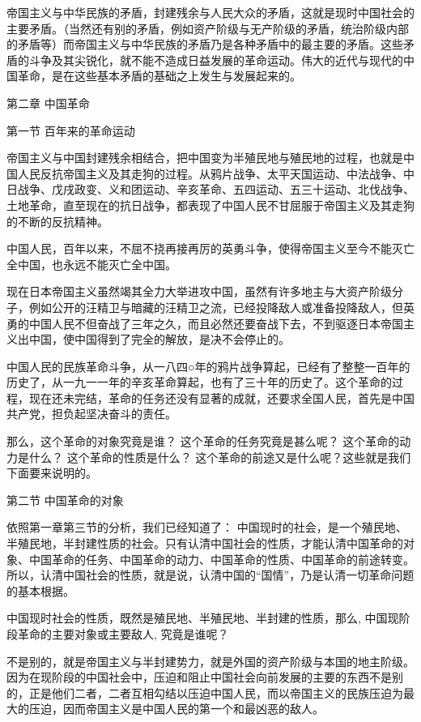 \documentclass[UTF8, 12pt, a4paper]{ctexrep}
\begin{document}
帝国主义与中华民族的矛盾，封建残余与人民大众的矛盾，这就是现时中国社会的主要矛盾。（当然还有别的矛盾，例如资产阶级与无产阶级的矛盾，统治阶级内部的矛盾等）而帝国主义与中华民族的矛盾乃是各种矛盾中的最主要的矛盾。这些矛盾的斗争及其尖锐化，就不能不造成日益发展的革命运动。伟大的近代与现代的中国革命，是在这些基本矛盾的基础之上发生与发展起来的。

第二章 中国革命

第一节 百年来的革命运动

帝国主义与中国封建残余相结合，把中国变为半殖民地与殖民地的过程，也就是中国人民反抗帝国主义及其走狗的过程。从鸦片战争、太平天国运动、中法战争、中日战争、戊戌政变、义和团运动、辛亥革命、五四运动、五三十运动、北伐战争、土地革命，直至现在的抗日战争，都表现了中国人民不甘屈服于帝国主义及其走狗的不断的反抗精神。

中国人民，百年以来，不屈不挠再接再厉的英勇斗争，使得帝国主义至今不能灭亡全中国，也永远不能灭亡全中国。

现在日本帝国主义虽然竭其全力大举进攻中国，虽然有许多地主与大资产阶级分子，例如公开的汪精卫与暗藏的汪精卫之流，已经投降敌人或准备投降敌人，但英勇的中国人民不但奋战了三年之久，而且必然还要奋战下去，不到驱逐日本帝国主义出中国，使中国得到了完全的解放，是决不会停止的。

中国人民的民族革命斗争，从一八四○年的鸦片战争算起，已经有了整整一百年的历史了，从一九一一年的辛亥革命算起，也有了三十年的历史了。这个革命的过程，现在还未完结，革命的任务还没有显著的成就，还要求全国人民，首先是中国共产党，担负起坚决奋斗的责任。

那么，这个革命的对象究竟是谁？ 这个革命的任务究竟是甚么呢？ 这个革命的动力是什么？ 这个革命的性质是什么？ 这个革命的前途又是什么呢？这些就是我们下面要来说明的。

第二节 中国革命的对象

依照第一章第三节的分析，我们已经知道了： 中国现时的社会，是一个殖民地、半殖民地，半封建性质的社会。只有认清中国社会的性质，才能认清中国革命的对象、中国革命的任务、中国革命的动力、中国革命的性质、中国革命的前途转变。所以，认清中国社会的性质，就是说，认清中国的“国情”，乃是认清一切革命问题的基本根据。

中国现时社会的性质，既然是殖民地、半殖民地、半封建的性质，那么, 中国现阶段革命的主要对象或主要敌人, 究竟是谁呢？

不是别的，就是帝国主义与半封建势力，就是外国的资产阶级与本国的地主阶级。因为在现阶段的中国社会中，压迫和阻止中国社会向前发展的主要的东西不是别的，正是他们二者，二者互相勾结以压迫中国人民，而以帝国主义的民族压迫为最大的压迫，因而帝国主义是中国人民的第一个和最凶恶的敌人。
\end{document}
